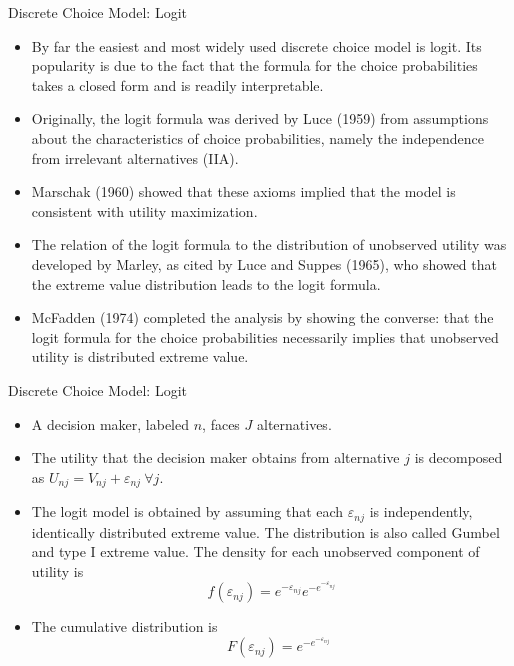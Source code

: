 \begin{frame}{Discrete Choice Model: Logit}
\begin{itemize}
\item By far the easiest and most widely used discrete choice model is logit. Its popularity is due to the fact that the formula for the choice probabilities takes a closed form and is readily interpretable.
\item Originally, the logit formula was derived by Luce (1959) from assumptions about the characteristics of choice probabilities, namely the independence from irrelevant alternatives (IIA).
\item Marschak (1960) showed that these axioms implied that the model is consistent with utility maximization.
\item The relation of the logit formula to the distribution of unobserved utility was developed by Marley, as cited by Luce and Suppes (1965), who showed that the extreme value distribution leads to the logit formula. \item McFadden (1974) completed the analysis by showing the converse: that the logit formula for the choice probabilities necessarily implies that unobserved utility is distributed extreme value.
\end{itemize}
\end{frame}


\begin{frame}{Discrete Choice Model: Logit}
\begin{itemize}
\item A decision maker, labeled $n$, faces $J$ alternatives.
\item The utility that the decision maker obtains from alternative $j$ is decomposed as $U_{n j}=V_{n j}+\varepsilon_{n j} \ \forall j$.
\item The logit model is obtained by assuming that each $\varepsilon_{n j}$ is independently, identically distributed extreme value. The distribution is also called Gumbel and type I extreme value. The density for each unobserved component of utility is
$$f\left(\varepsilon_{n j}\right)=e^{-\varepsilon_{n j}} e^{-e^{-\varepsilon_{n j}}}$$
\item The cumulative distribution is $$\quad F\left(\varepsilon_{n j}\right)=e^{-e^{-\varepsilon_{n j}}}$$
\end{itemize}
\end{frame}



